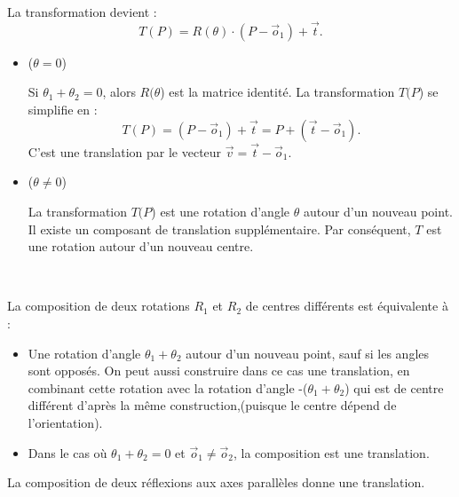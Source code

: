 La transformation devient :
\[ T (P) = R (\theta) \cdot (P - \vec{o}_1) + \vec{t} . \]
\begin{itemize}
  \item {} ($\theta = 0$)
  
  Si $\theta_1 + \theta_2 = 0$, alors $R (\theta$) est la matrice
  identit{\'e}. La transformation $T (P$) se simplifie en :
  \[ T (P) = (P - \vec{o}_1) + \vec{t} = P + (\vec{t} - \vec{o}_1) . \]
  C'est une translation par le vecteur $\vec{v} = \vec{t} - \vec{o}_1$.
  
  \item {} ($\theta \neq
  0$)
  
  La transformation $T (P$) est une rotation d'angle $\theta$ autour d'un
  nouveau point. Il existe un composant de translation suppl{\'e}mentaire. Par
  cons{\'e}quent, $T$ est une rotation autour d'un nouveau centre.
\end{itemize}


\

La composition de deux rotations $R_1$ et $R_2$ de centres diff{\'e}rents est
{\'e}quivalente {\`a} :
\begin{itemize}
  \item Une rotation d'angle $\theta_1 + \theta_2$ autour d'un nouveau point,
  sauf si les angles sont oppos{\'e}s. On peut aussi construire dans ce cas
  une translation, en combinant cette rotation avec la rotation d'angle
  -($\theta_1 + \theta_2$) qui est de centre diff{\'e}rent d'apr{\`e}s la
  m{\^e}me construction,(puisque le centre d{\'e}pend de l'orientation).
  
  \item Dans le cas o{\`u} $\theta_1 + \theta_2 = 0$ et $\vec{o}_1 \neq
  \vec{o}_2$, la composition est une translation.
\end{itemize}



La composition de deux r{\'e}flexions aux axes parall{\`e}les donne une
translation.

\


